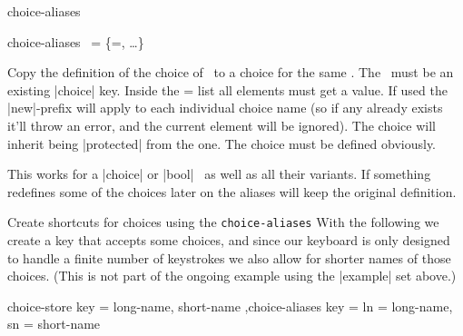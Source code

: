 \begin{function}[module=expkv-def type]{choice-aliases}
  \begin{syntax}
    choice-aliases \key\ = \{=, \ldots\} 
  \end{syntax}
  Copy the definition of the choice  of \key\ to a  choice
  for the same \key. The \key\ must be an existing |choice| key. Inside the
  = list all elements must get a value. If used the
  |new|-prefix will apply to each individual  choice name (so if any
  already exists it'll throw an error, and the current element will be ignored).
  The  choice will inherit being |protected| from the  one.
  The  choice must be defined obviously.

  This works for a |choice| or |bool| \type\ as well as all their variants. If
  something redefines some of the choices later on the aliases will keep the
  original definition.
\end{function}
\begin{example}
    {Create shortcuts for choices using the \texttt{choice-aliases} \type}
  With the following we create a key that accepts some choices, and since our
  keyboard is only designed to handle a finite number of keystrokes we also
  allow for shorter names of those choices. (This is not part of the ongoing
  example using the |example| set above.)
  \begin{enverb}
      {
         choice-store   key = { long-name, short-name }
        ,choice-aliases key = { ln = long-name, sn = short-name }
      }
  \end{enverb}
\end{example}

%


